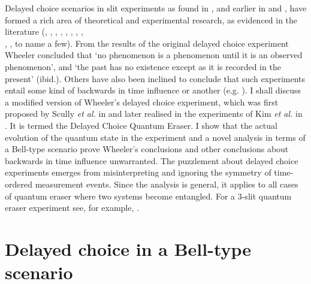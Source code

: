 \documentclass[11pt]{article}
\numberwithin{equation}{section}
\begin{document}
Delayed choice scenarios in slit experiments as found in \cite{wheeler1978past}, and earlier in \cite{von1941deutung} and \cite{bohr1996discussion}, have formed a rich area of theoretical and experimental research, as evidenced in the literature (\cite{eichmann1993young}, \cite{englert2000quantitative},  \cite{doi:10.1119/1.19257}, \cite{doi:10.1119/1.19258}, \cite{Kim1999}, \cite{walborn2002double}, \cite{kwiat2004science}, \cite{aharonov2005time},\\
\cite{Peres2000}, \cite{Egg2013}, to name a few). 
From the results of the original delayed choice experiment Wheeler concluded that  `no phenomenon is a phenomenon until it is an observed phenomenon', and `the past has
no existence except as it is recorded in the present' (ibid.). Others have also been inclined to conclude that such experiments entail some kind of backwards in time influence or another (e.g. \cite{doi:10.1119/1.19258}). I shall discuss a modified version of Wheeler's delayed choice experiment, which was first proposed by  Scully\textit{ et al.} in \cite{scully1982quantum} and later realised in the experiments of Kim \textit{et al.} in \cite{Kim1999}. It is termed the Delayed Choice Quantum Eraser. I show that the actual evolution of the quantum state in the experiment and a novel analysis in terms of a Bell-type scenario prove Wheeler's conclusions and other conclusions about backwards in time influence  unwarranted. The puzzlement about delayed choice experiments emerges from misinterpreting and ignoring the symmetry of time-ordered measurement events.  Since the analysis is general, it applies to all cases of quantum eraser where two systems become entangled. For a 3-slit quantum eraser experiment see, for example, \cite{shah2017quantum}. 


\section{Delayed choice in a Bell-type scenario}
\label{Bell}
\end{document}
